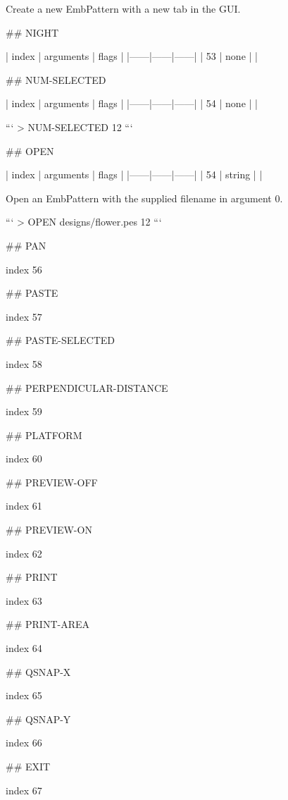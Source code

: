 Create a new EmbPattern with a new tab in the GUI.

## NIGHT

| index | arguments | flags |
|------|------|------|
| 53 | none | |



## NUM-SELECTED

| index | arguments | flags |
|------|------|------|
| 54 | none | |

```
> NUM-SELECTED
12
```

## OPEN

| index | arguments | flags |
|------|------|------|
| 54 | string | |

Open an EmbPattern with the supplied filename in argument 0.

```
> OPEN designs/flower.pes
12
```

## PAN

index 56



## PASTE

index 57



## PASTE-SELECTED

index 58



## PERPENDICULAR-DISTANCE

index 59



## PLATFORM

index 60



## PREVIEW-OFF

index 61



## PREVIEW-ON

index 62



## PRINT

index 63



## PRINT-AREA

index 64



## QSNAP-X

index 65



## QSNAP-Y

index 66



## EXIT

 index 67




